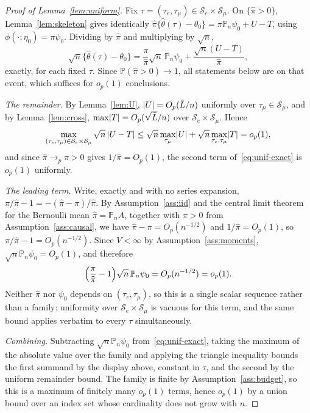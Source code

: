 \documentclass[11pt]{article}
\theoremstyle{plain}
\theoremstyle{definition}
\theoremstyle{remark}
\newcommand{\PP}{\mathbb{P}}
\newcommand{\Pn}{\mathbb{P}_n}
\newcommand{\cS}{\mathcal{S}}
\newcommand{\thetahat}{\widehat{\theta}}
\newcommand{\pihat}{\widehat{\pi}}
\DeclarePairedDelimiter{\abs}{\lvert}{\rvert}
\begin{document}
\begin{proof}[Proof of Lemma~\ref{lem:uniform}]
Fix $\tau=(\tau_e,\tau_\mu)\in\cS_e\times\cS_\mu$. On $\{\pihat>0\}$,
Lemma~\ref{lem:skeleton} gives identically
$\pihat\{\thetahat(\tau)-\theta_0\}=\pi\Pn\psi_0+U-T$, using
$\phi(\cdot;\eta_0)=\pi\psi_0$. Dividing by $\pihat$ and multiplying by
$\sqrt n$,
\begin{equation}\label{eq:unif-exact}
  \sqrt n\{\thetahat(\tau)-\theta_0\}
  =\frac\pi{\pihat}\sqrt n\,\Pn\psi_0+\frac{\sqrt n(U-T)}{\pihat},
\end{equation}
exactly, for each fixed $\tau$. Since $\PP(\pihat>0)\to1$, all statements below
are on that event, which suffices for $o_p(1)$ conclusions.

\emph{The remainder.} By Lemma~\ref{lem:U}, $\abs U=O_p(\bar L/n)$ uniformly over
$\tau_\mu\in\cS_\mu$, and by Lemma~\ref{lem:cross},
$\max\abs T=O_p(\sqrt{\bar L}/n)$ over $\cS_e\times\cS_\mu$. Hence
\[
  \max_{(\tau_e,\tau_\mu)\in\cS_e\times\cS_\mu}\sqrt n\,\abs{U-T}
  \le\sqrt n\max_{\tau_\mu}\abs U+\sqrt n\max_{\tau_e,\tau_\mu}\abs T=o_p(1),
\]
and since $\pihat\to_p\pi>0$ gives $1/\pihat=O_p(1)$, the second term
of~\eqref{eq:unif-exact} is $o_p(1)$ uniformly.

\emph{The leading term.} Write, exactly and with no series expansion,
$\pi/\pihat-1=-(\pihat-\pi)/\pihat$. By Assumption~\ref{ass:iid} and the central
limit theorem for the Bernoulli mean $\pihat=\Pn A$, together with $\pi>0$ from
Assumption~\ref{ass:causal}, we have $\pihat-\pi=O_p(n^{-1/2})$ and
$1/\pihat=O_p(1)$, so $\pi/\pihat-1=O_p(n^{-1/2})$. Since $V<\infty$ by
Assumption~\ref{ass:moments}, $\sqrt n\Pn\psi_0=O_p(1)$, and therefore
\[
  \Bigl(\frac\pi{\pihat}-1\Bigr)\sqrt n\,\Pn\psi_0=O_p(n^{-1/2})=o_p(1).
\]
Neither $\pihat$ nor $\psi_0$ depends on $(\tau_e,\tau_\mu)$, so this is a single
scalar sequence rather than a family: uniformity over $\cS_e\times\cS_\mu$ is
vacuous for this term, and the same bound applies verbatim to every $\tau$
simultaneously.

\emph{Combining.} Subtracting $\sqrt n\Pn\psi_0$
from~\eqref{eq:unif-exact}, taking the maximum of the absolute value over the
family and applying the triangle inequality bounds the first summand by the
display above, constant in $\tau$, and the second by the uniform remainder bound.
The family is finite by Assumption~\ref{ass:budget}, so this is a maximum of
finitely many $o_p(1)$ terms, hence $o_p(1)$ by a union bound over an index set
whose cardinality does not grow with $n$.
\end{proof}
\end{document}
